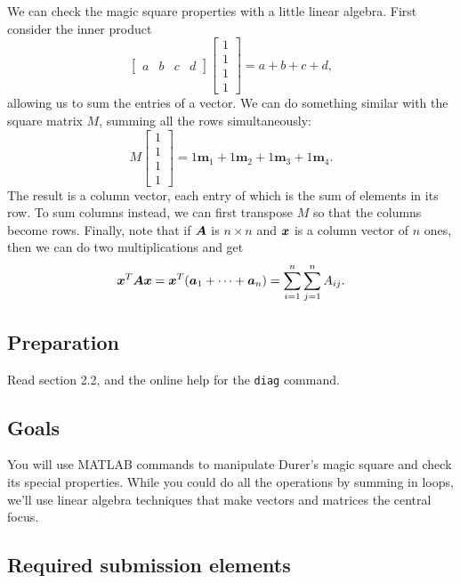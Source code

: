 \documentclass[11pt]{article}
\begin{document}
We can check the magic square properties with a little linear algebra. First consider the inner product 
\begin{equation}
	\label{ones}
\begin{bmatrix}
a & b & c & d 
\end{bmatrix} \begin{bmatrix}
1 \\ 1 \\ 1 \\ 1
\end{bmatrix}
= a + b + c + d,
\end{equation}
allowing us to sum the entries of a vector. We can do something similar with the square matrix $M$, summing all the rows simultaneously:
\begin{equation}
	\label{Mones}
	M \begin{bmatrix}
		1 \\ 1 \\ 1 \\ 1
	\end{bmatrix}
	= 1 \bm{m}_1 + 1 \bm{m}_2 + 1 \bm{m}_3 + 1 \bm{m}_4.
\end{equation}
The result is a column vector, each entry of which is the sum of elements in its row. To sum columns instead, we can first transpose $M$ so that the columns become rows. Finally, note that if $\bm{A}$ is $n\times n$ and $\bm{x}$ is a column vector of $n$ ones, then we can do two multiplications and get
\begin{equation}
	\label{sumall}
	\bm{x}^T \bm{A} \bm{x} = \bm{x}^T ( \bm{a}_1 + \cdots + \bm{a}_n) = \sum_{i=1}^n \sum_{j=1}^n A_{ij}.
\end{equation}


\subsection*{Preparation}

Read section 2.2, and the online help for the \texttt{diag} command.

\subsection*{Goals}

You will use MATLAB commands to manipulate Durer's magic square and check its special properties. While you could do all the operations by summing in loops, we'll use linear algebra techniques that make vectors and matrices the central focus.

\subsection*{Required submission elements}
\end{document}
